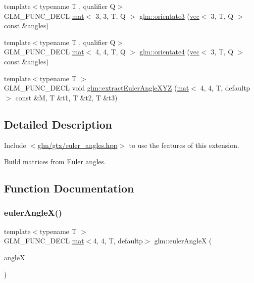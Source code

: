 \begin{DoxyCompactItemize}
{\footnotesize template$<$typename T , qualifier Q$>$ }\\G\+L\+M\+\_\+\+F\+U\+N\+C\+\_\+\+D\+E\+CL \hyperlink{structglm_1_1mat}{mat}$<$ 3, 3, T, Q $>$ \hyperlink{group__gtx__euler__angles_ga7238c8e15c7720e3ca6a45ab151eeabb}{glm\+::orientate3} (\hyperlink{structglm_1_1vec}{vec}$<$ 3, T, Q $>$ const \&angles)
\item 
{\footnotesize template$<$typename T , qualifier Q$>$ }\\G\+L\+M\+\_\+\+F\+U\+N\+C\+\_\+\+D\+E\+CL \hyperlink{structglm_1_1mat}{mat}$<$ 4, 4, T, Q $>$ \hyperlink{group__gtx__euler__angles_ga4a044653f71a4ecec68e0b623382b48a}{glm\+::orientate4} (\hyperlink{structglm_1_1vec}{vec}$<$ 3, T, Q $>$ const \&angles)
\item 
{\footnotesize template$<$typename T $>$ }\\G\+L\+M\+\_\+\+F\+U\+N\+C\+\_\+\+D\+E\+CL void \hyperlink{group__gtx__euler__angles_gacea701562f778c1da4d3a0a1cf091000}{glm\+::extract\+Euler\+Angle\+X\+YZ} (\hyperlink{structglm_1_1mat}{mat}$<$ 4, 4, T, defaultp $>$ const \&M, T \&t1, T \&t2, T \&t3)
\end{DoxyCompactItemize}


\subsection{Detailed Description}
Include $<$\hyperlink{euler__angles_8hpp}{glm/gtx/euler\+\_\+angles.\+hpp}$>$ to use the features of this extension.

Build matrices from Euler angles. 

\subsection{Function Documentation}
\mbox{\label{group__gtx__euler__angles_gafba6282e4ed3ff8b5c75331abfba3489}} 
\subsubsection{\texorpdfstring{euler\+Angle\+X()}{eulerAngleX()}}
{\footnotesize\ttfamily template$<$typename T $>$ \\
G\+L\+M\+\_\+\+F\+U\+N\+C\+\_\+\+D\+E\+CL \hyperlink{structglm_1_1mat}{mat}$<$4, 4, T, defaultp$>$ glm\+::euler\+AngleX (\begin{DoxyParamCaption}\item[{T const \&}]{angleX }\end{DoxyParamCaption})}




